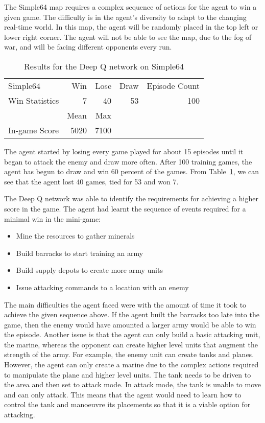 The Simple64 map requires a complex sequence of actions for the agent to win a
given game. The difficulty is in the agent's diversity to adapt to the changing
real-time world. In this map, the agent will be randomly placed in the top left
or lower right corner. The agent will not be able to see the map, due to the fog
of war, and will be facing different opponents every run.

\begin{table}[h]
    \centering
    \begin{tabular}{@{}lrrrr@{}}
        \toprule
        Simple64        & Win  & Lose  & Draw & Episode Count \\
        Win Statistics  & 7    & 40    & 53   & 100           \\
        \midrule
        \midrule
                      & Mean & Max  \\
        In-game Score & 5020 & 7100 \\
 \bottomrule
    \end{tabular}
    \caption{Results for the Deep Q network on Simple64}%
    \label{tab:dqn_simple}%
\end{table}

The agent started by losing every game played for about 15 episodes until it
began to attack the enemy and draw more often. After 100 training games, the
agent has begun to draw and win 60 percent of the games. From
Table~\ref{tab:dqn_simple}, we can see that the agent lost 40 games, tied for 53
and won 7.

The Deep Q network was able to identify the requirements for achieving a higher
score in the game. The agent had learnt the sequence of events required for a
minimal win in the mini-game:

\begin{itemize}
    \item Mine the resources to gather minerals
    \item Build barracks to start training an army
    \item Build supply depots to create more army units
    \item Issue attacking commands to a location with an enemy
\end{itemize}

The main difficulties the agent faced were with the amount of time it took to
achieve the given sequence above. If the agent built the barracks too late into
the game, then the enemy would have amounted a larger army would be able to win
the episode. Another issue is that the agent can only build a basic attacking
unit, the marine, whereas the opponent can create higher level units that
augment the strength of the army. For example, the enemy unit can create
tanks and planes. However, the agent can only create a marine due to the complex
actions required to manipulate the plane and higher level units. The tank needs
to be driven to the area and then set to attack mode. In attack mode, the tank
is unable to move and can only attack. This means that the agent would need to
learn how to control the tank and manoeuvre its placements so that it is a
viable option for attacking.

